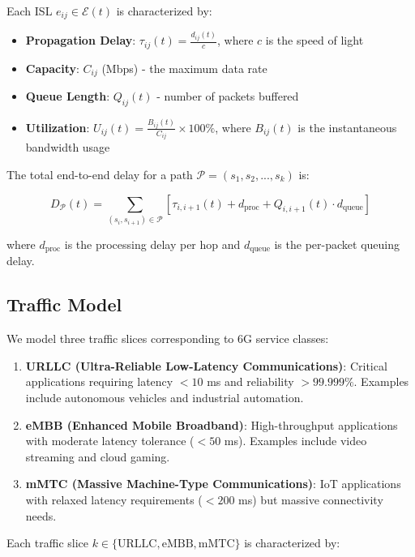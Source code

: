 Each ISL $e_{ij} \in \mathcal{E}(t)$ is characterized by:

\begin{itemize}
\item \textbf{Propagation Delay}: $\tau_{ij}(t) = \frac{d_{ij}(t)}{c}$, where $c$ is the speed of light
\item \textbf{Capacity}: $C_{ij}$ (Mbps) - the maximum data rate
\item \textbf{Queue Length}: $Q_{ij}(t)$ - number of packets buffered
\item \textbf{Utilization}: $U_{ij}(t) = \frac{B_{ij}(t)}{C_{ij}} \times 100\%$, where $B_{ij}(t)$ is the instantaneous bandwidth usage
\end{itemize}

The total end-to-end delay for a path $\mathcal{P} = (s_1, s_2, ..., s_k)$ is:

\begin{equation}
D_{\mathcal{P}}(t) = \sum_{(s_i,s_{i+1}) \in \mathcal{P}} \left[\tau_{i,i+1}(t) + d_{\text{proc}} + Q_{i,i+1}(t) \cdot d_{\text{queue}}\right]
\end{equation}

where $d_{\text{proc}}$ is the processing delay per hop and $d_{\text{queue}}$ is the per-packet queuing delay.

\subsection{Traffic Model}

We model three traffic slices corresponding to 6G service classes:

\begin{enumerate}
\item \textbf{URLLC (Ultra-Reliable Low-Latency Communications)}: Critical applications requiring latency $< 10$ ms and reliability $> 99.999\%$. Examples include autonomous vehicles and industrial automation.

\item \textbf{eMBB (Enhanced Mobile Broadband)}: High-throughput applications with moderate latency tolerance ($< 50$ ms). Examples include video streaming and cloud gaming.

\item \textbf{mMTC (Massive Machine-Type Communications)}: IoT applications with relaxed latency requirements ($< 200$ ms) but massive connectivity needs.
\end{enumerate}

Each traffic slice $k \in \{\text{URLLC}, \text{eMBB}, \text{mMTC}\}$ is characterized by:

